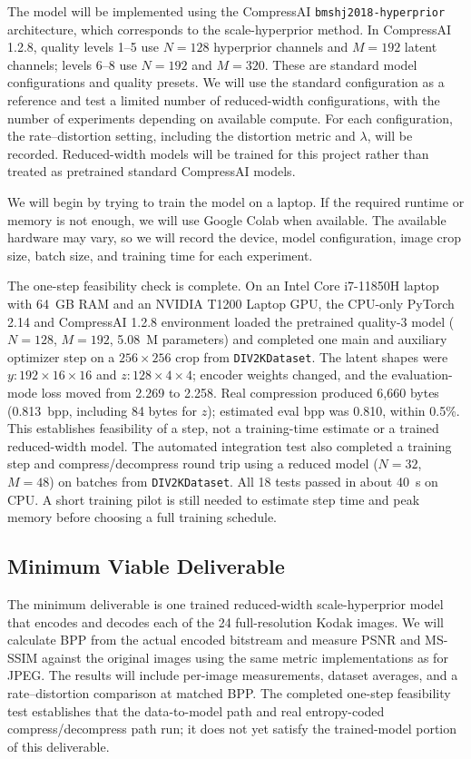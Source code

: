 \documentclass[11pt]{article}
\begin{document}
The model will be implemented using the CompressAI
\texttt{bmshj2018-hyperprior} architecture, which corresponds to the
scale-hyperprior method. In CompressAI 1.2.8, quality levels 1--5 use
$N=128$ hyperprior channels and $M=192$ latent channels; levels 6--8
use $N=192$ and $M=320$. These are standard model configurations and
quality presets. We will use the standard configuration as a reference
and test a limited number of reduced-width configurations, with the
number of experiments depending on available compute. For each
configuration, the rate--distortion setting, including the distortion
metric and $\lambda$, will be recorded. Reduced-width models will be
trained for this project rather than treated as pretrained standard
CompressAI models.

We will begin by trying to train the model on a laptop. If the required
runtime or memory is not enough, we will use Google Colab when
available. The available hardware may vary, so we will record the
device, model configuration, image crop size, batch size, and training
time for each experiment.

The one-step feasibility check is complete. On an Intel Core i7-11850H laptop
with 64~GB RAM and an NVIDIA T1200 Laptop GPU, the CPU-only PyTorch 2.14 and
CompressAI 1.2.8 environment loaded the pretrained quality-3 model ($N=128$,
$M=192$, 5.08~M parameters) and completed one main and auxiliary optimizer step
on a $256\times256$ crop from \texttt{DIV2KDataset}. The latent shapes were
$y:192\times16\times16$ and $z:128\times4\times4$; encoder weights changed, and
the evaluation-mode loss moved from 2.269 to 2.258. Real compression produced
6{,}660 bytes (0.813~bpp, including 84 bytes for $z$); estimated eval bpp was
0.810, within 0.5\%. This establishes feasibility of a step, not a training-time
estimate or a trained reduced-width model. The automated integration test also
completed a training step and compress/decompress round trip using a reduced
model ($N=32$, $M=48$) on batches from \texttt{DIV2KDataset}. All 18 tests passed
in about 40~s on CPU. A short training pilot is still needed to estimate step
time and peak memory before choosing a full training schedule.


\subsection{Minimum Viable Deliverable}
The minimum deliverable is one trained reduced-width scale-hyperprior model
that encodes and decodes each of the 24 full-resolution Kodak images. We will
calculate BPP from the actual encoded bitstream and measure PSNR and MS-SSIM
against the original images using the same metric implementations as for JPEG.
The results will include per-image measurements, dataset averages, and a
rate--distortion comparison at matched BPP. The completed one-step feasibility
test establishes that the data-to-model path and real entropy-coded
compress/decompress path run; it does not yet satisfy the trained-model portion
of this deliverable.
\end{document}
